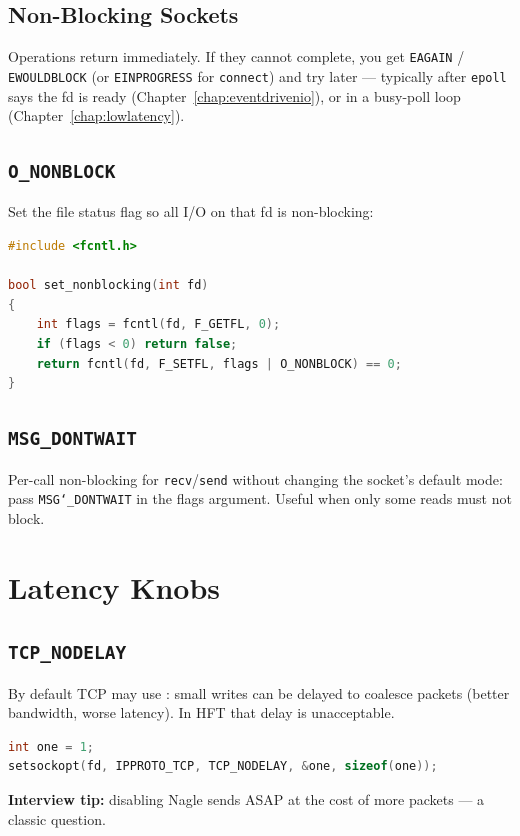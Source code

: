 \subsection{Non-Blocking Sockets}
\label{subsec:nonblocking-sockets}
Operations return immediately. If they cannot complete, you get \texttt{EAGAIN} / 
\texttt{EWOULDBLOCK} (or \texttt{EINPROGRESS} for \texttt{connect}) and try later --- typically after 
\texttt{epoll} says the fd is ready (Chapter~\ref{chap:eventdrivenio}), or in a busy-poll loop 
(Chapter~\ref{chap:lowlatency}).

\subsection{\texttt{O\_NONBLOCK}}
\label{subsec:o-nonblock}
Set the file status flag so all I/O on that fd is non-blocking:
\begin{lstlisting}[language=C++]
#include <fcntl.h>

bool set_nonblocking(int fd)
{
    int flags = fcntl(fd, F_GETFL, 0);
    if (flags < 0) return false;
    return fcntl(fd, F_SETFL, flags | O_NONBLOCK) == 0;
}
\end{lstlisting}

\subsection{\texttt{MSG\_DONTWAIT}}
\label{subsec:msg-dontwait}
Per-call non-blocking for \texttt{recv}/\texttt{send} without changing the socket's default mode: 
pass \texttt{MSG\char`_DONTWAIT} in the flags argument. Useful when only some reads must not block.

\section{Latency Knobs}
\label{sec:tcp-latency-knobs}

\subsection{\texttt{TCP\_NODELAY}}
\label{subsec:tcp-nodelay}
By default TCP may use : small writes can be delayed to coalesce 
packets (better bandwidth, worse latency). In HFT that delay is unacceptable.
\begin{lstlisting}[language=C++]
int one = 1;
setsockopt(fd, IPPROTO_TCP, TCP_NODELAY, &one, sizeof(one));
\end{lstlisting}
\par\noindent\textbf{Interview tip:} disabling Nagle sends ASAP at the cost of more packets --- a classic question.

